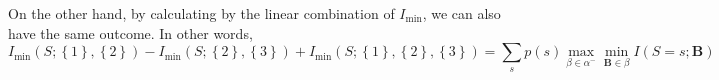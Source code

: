 On the other hand, by calculating by the linear combination of $I_{\min}$, we can also have the same outcome. In other words,
\begin{equation}I_{\min} \left( S; \left\{ 1 \right\} ,\left\{ 2 \right\} \right) - I_{\min} \left( S; \left\{ 2 \right\} ,\left\{ 3 \right\} \right) +I_{\min} \left( S; \left\{ 1 \right\} ,\left\{ 2 \right\} ,\left\{ 3 \right\}\right)=\sum_{s} p(s) \max _{\beta \in \alpha^{-}} \min _{\mathbf{B} \in \beta} I(S=s ; \mathbf{B})\end{equation}


